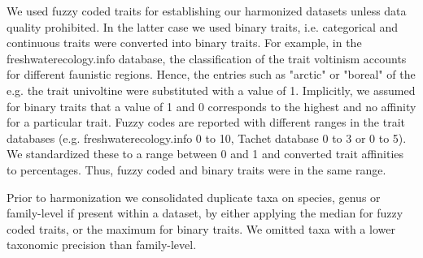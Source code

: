 \documentclass{article}
\begin{document}
We used fuzzy coded traits for establishing our harmonized datasets unless data quality prohibited. In the latter case we used binary traits, i.e. categorical and continuous traits were converted into binary traits. For example, in the  freshwaterecology.info database, the classification of the trait voltinism accounts for different faunistic regions. Hence, the entries such as "arctic" or "boreal" of the e.g. the trait univoltine were substituted with a value of 1. Implicitly, we assumed for binary traits that a value of 1 and 0 corresponds to the highest and no affinity for a particular trait. Fuzzy codes are reported with different ranges in the trait databases (e.g. freshwaterecology.info 0 to 10, Tachet database 0 to 3 or 0 to 5). We standardized these to a range between 0 and 1 and converted trait affinities to percentages. Thus, fuzzy coded and binary traits were in the same range. 

Prior to harmonization we consolidated duplicate taxa on species, genus or family-level if present within a dataset, by either applying the median for fuzzy coded traits, or the maximum for binary traits. We omitted taxa with a lower taxonomic precision than family-level.
\end{document}
